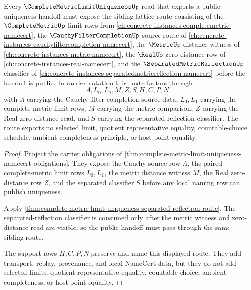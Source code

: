 \begin{theorem}
\label{thm:complete-metric-limit-uniqueness-sibling-route}
Every $\CompleteMetricLimitUniquenessUp$ read that exports a public uniqueness handoff must expose the sibling lattice route consisting of the $\CompleteMetricUp$ limit rows from \autoref{ch:concrete-instances-completemetric-namecert}, the $\CauchyFilterCompletionUp$ source route of \autoref{ch:concrete-instances-cauchyfiltercompletion-namecert}, the $\MetricUp$ distance witness of \autoref{ch:concrete-instances-metric-namecert}, the $\RealUp$ zero-distance row of \autoref{ch:concrete-instances-real-namecert}, and the $\SeparatedMetricReflectionUp$ classifier of \autoref{ch:concrete-instances-separatedmetricreflection-namecert} before the handoff is public. In carrier notation this route factors through
$$
A,L_{0},L_{1},M,Z,S,H,C,P,N
$$
with $A$ carrying the Cauchy-filter completion source data, $L_{0},L_{1}$ carrying the complete-metric limit rows, $M$ carrying the metric comparison, $Z$ carrying the Real zero-distance read, and $S$ carrying the separated-reflection classifier. The route exports no selected limit, quotient representative equality, countable-choice schedule, ambient completeness principle, or host point equality.
\end{theorem}
\begin{proof}
Project the carrier obligations of \autoref{thm:complete-metric-limit-uniqueness-namecert-obligations}. They expose the Cauchy-source row $A$, the paired complete-metric limit rows $L_{0},L_{1}$, the metric distance witness $M$, the Real zero-distance row $Z$, and the separated classifier $S$ before any local naming row can publish uniqueness.

Apply \autoref{thm:complete-metric-limit-uniqueness-separated-reflection-route}. The separated-reflection classifier is consumed only after the metric witness and zero-distance read are visible, so the public handoff must pass through the same sibling route.

The support rows $H,C,P,N$ preserve and name this displayed route. They add transport, replay, provenance, and local NameCert data, but they do not add selected limits, quotient representative equality, countable choice, ambient completeness, or host point equality.
\end{proof}
